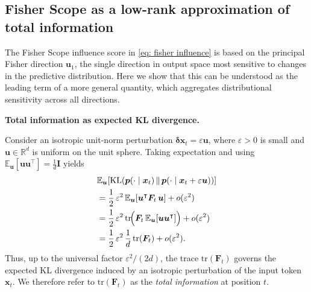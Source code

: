 \documentclass{article}
\begin{document}
\subsection{Fisher Scope as a low-rank approximation of total information}
\label{app:fisher_total_information}

The Fisher Scope influence score in \cref{eq: fisher influence} is based on 
the principal Fisher direction $\bm{u}_1$, the single direction in output 
space most sensitive to changes in the predictive distribution. Here we show 
that this can be understood as the leading term of a more general quantity, which aggregates distributional sensitivity 
across all directions.

\noindent\textbf{Total information as expected KL divergence.}

Consider an isotropic unit-norm perturbation $\bm{\delta x}_t= \varepsilon \bm{u}$, 
where $\varepsilon > 0$ is small and $\bm{u} \in \mathbb{R}^d$ is uniform on 
the unit sphere. 
Taking expectation and using
$\mathbb{E}_{\bm{u}}[\bm{u}\bm{u}^\intercal]=\tfrac{1}{d}\bm{I}$ yields
\begin{align}
&\mathbb{E}_{\bm{u}}\!\left[
\mathrm{KL}\!\left(\bm{p}(\cdot\mid \bm{x}_t) \,\middle\|\, \bm{p}(\cdot\mid \bm{x}_t+\varepsilon\bm{u})\right)
\right] \notag \\
&=
\frac{1}{2}\,\varepsilon^2\,
\mathbb{E}_{\bm{u}}\!\left[\bm{u}^\intercal \bm{F}_t\,\bm{u}\right]
+ o(\varepsilon^2)
\notag\\
&=
\frac{1}{2}\,\varepsilon^2\,
\mathrm{tr}\!\Big(\bm{F}_t\,\mathbb{E}_{\bm{u}}[\bm{u}\bm{u}^\intercal]\Big)
+ o(\varepsilon^2)
\notag\\
&=
\frac{1}{2}\,\varepsilon^2\,
\frac{1}{d}\,
\mathrm{tr}(\bm{F}_t)
+ o(\varepsilon^2).
\label{eq:expected_kl_trace}
\end{align}
Thus, up to the universal factor $\varepsilon^2/(2d)$, the trace 
$\mathrm{tr}(\bm{F}_t)$ governs the expected KL divergence induced by an 
isotropic perturbation of the input token $\bm{x}_t$. We therefore refer 
to $\mathrm{tr}(\bm{F}_t)$ as the \emph{total information} at position $t$.
\end{document}
